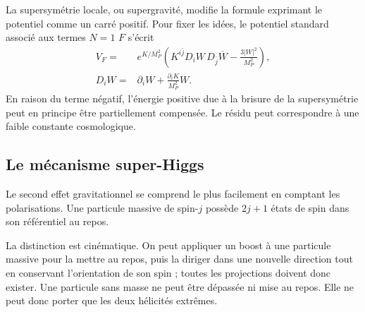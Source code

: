 La supersymétrie locale, ou supergravité, modifie la formule exprimant le potentiel comme un carré positif. Pour fixer les idées, le potentiel standard associé aux termes \(N=1\) \(F\) s’écrit
\begin{equation}
\begin{aligned}
V_F={}&e^{K/M_P^2}
\left(
K^{i\bar j}D_iW\,D_{\bar j}\overline W
-\frac{3|W|^2}{M_P^2}
\right),\\
D_iW={}&\partial_iW+\frac{\partial_iK}{M_P^2}W.
\end{aligned}
\label{eq:l9-sugra-potential}
\end{equation}
En raison du terme négatif, l’énergie positive due à la brisure de la supersymétrie peut en principe être partiellement compensée. Le résidu peut correspondre à une faible constante cosmologique.


\subsection{Le mécanisme super-Higgs}

Le second effet gravitationnel se comprend le plus facilement en comptant les polarisations. Une particule massive de spin-\(j\) possède \(2j+1\) états de spin dans son référentiel au repos.

\begin{classroomqa}\end{classroomqa}

La distinction est cinématique. On peut appliquer un boost à une particule massive pour la mettre au repos, puis la diriger dans une nouvelle direction tout en conservant l’orientation de son spin ; toutes les projections doivent donc exister. Une particule sans masse ne peut être dépassée ni mise au repos. Elle ne peut donc porter que les deux hélicités extrêmes.

